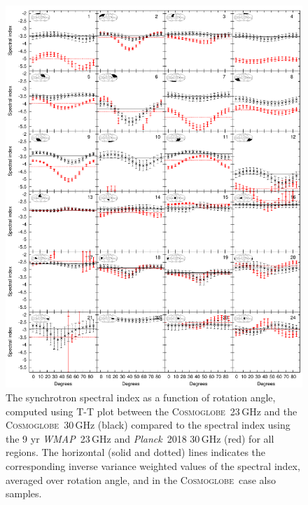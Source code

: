 \documentclass[twocolumn]{../../common/aa}
\def\WMAP{\emph{WMAP}}
\def\Planck{\emph{Planck}}
\newcommand{\Cosmoglobe}{\textsc{Cosmoglobe}}
\begin{document}
\begin{figure}
        \centering
        \includegraphics[width=\linewidth]{figures/cos30_ut_big_multialphaplot_converted.pdf}
        \caption{The synchrotron spectral index as a function of rotation angle, computed using T-T plot between the \Cosmoglobe\ 23\,GHz and the \Cosmoglobe\ 30\,GHz (black) compared to the spectral index using the 9 yr \WMAP\ 23\,GHz and \Planck\ 2018 30\,GHz (red) for all regions. The horizontal (solid and dotted) lines indicates the corresponding inverse variance weighted values of the spectral index, averaged over rotation angle, and in the \Cosmoglobe\ case also samples.}
        \label{fig:cos30_beta_bigalpha}
\end{figure}
\end{document}
